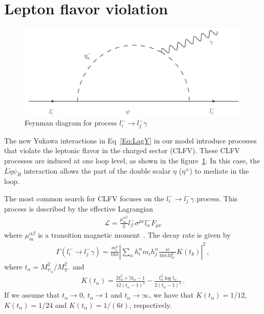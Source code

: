 \documentclass[12pt]{article}
\begin{document}
\section{Lepton flavor violation}
\label{sec:LFV}
%
\begin{figure}
\centering
\includegraphics[scale=0.6]{LFV.pdf}
\caption{Feynman diagram for process $l^{-}_{i} \to l^{-}_{j} \gamma$}
\label{fig:LFV}
\end{figure}
%
The new Yukawa interactions in Eq~\eqref{Eq:LagY} in our model introduce processes that violate the leptonic flavor in the charged sector (CLFV). These CLFV processes are induced at one loop level, as shown in the figure~\ref{fig:LFV}. In this case, the $\overline{L} \tilde{\eta} \psi_{R}$ interaction allows the part of the double scalar $\eta$ ($\eta^{\pm}$) to mediate in the loop.

The most common search for CLFV focuses on the $l^{-}_{i} \to l^{-}_{j} \gamma$ process. This process is described by the effective Lagrangian
%
\begin{align}
    \mathcal{L} = \frac{\mu_{m}^{\alpha \beta}}{2} l^{-}_{\beta} \sigma^{\mu \nu} l^{-}_{\alpha} F_{\mu \nu}
\end{align}
%
where $\mu_{m}^{\alpha \beta}$ is a transition magnetic moment~\cite{Toma:2013zsa}.
The decay rate is given by~\cite{Lavoura:2003xp}
%
\begin{align}
 \Gamma(l^{-}_{i} \to l^{-}_{j} \gamma) = \frac{m^{3}_{i}}{16 \pi} \left| \sum_{\alpha} h^{\alpha}_{i} m_{i} h^{\alpha}_{j} \frac{i e}{16 \pi M^{2}_{\eta^{-}}} K(t_{k}) \right|^{2}\,, 
\end{align}
%
where $t_{\alpha} = M^{2}_{\psi_{\alpha}}/M^{2}_{\eta^{-}}$ and
%
\begin{align}
    K(t_{\alpha}) = \frac{2t_{\alpha}^{2}+5t_{\alpha}-1}{12(t_{\alpha}-1)^{3}} - \frac{t_{\alpha}^{2}\log t_{\alpha}}{2(t_{\alpha}-1)^{4}}\,.
\end{align}
%
If we assume that $t_{\alpha} \to 0$, $t_{\alpha} \to 1$ and $t_{\alpha} \to \infty$, we have that $K(t_{\alpha}) = 1/12$, $K(t_{\alpha}) = 1/24$ and $K(t_{\alpha}) = 1/(6t)$, respectively.
\end{document}
